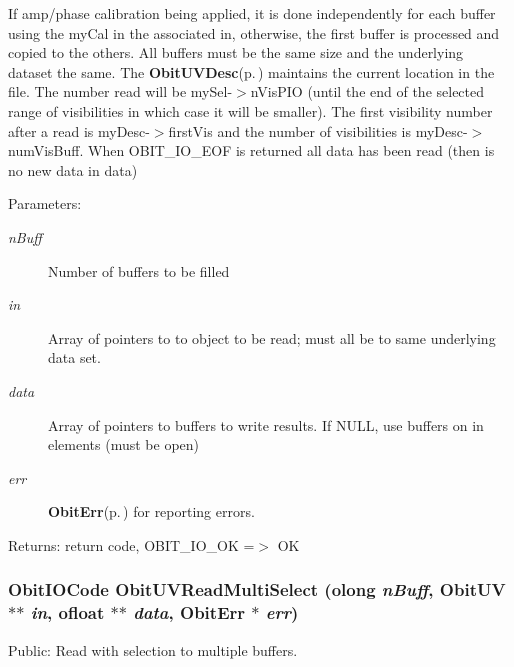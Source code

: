 If amp/phase calibration being applied, it is done independently for each buffer using the my\-Cal in the associated in, otherwise, the first buffer is processed and copied to the others. All buffers must be the same size and the underlying dataset the same. The {\bf Obit\-UVDesc}{\rm (p.\,\pageref{structObitUVDesc})} maintains the current location in the file. The number read will be my\-Sel-$>$n\-Vis\-PIO (until the end of the selected range of visibilities in which case it will be smaller). The first visibility number after a read is my\-Desc-$>$first\-Vis and the number of visibilities is my\-Desc-$>$num\-Vis\-Buff. When OBIT\_\-IO\_\-EOF is returned all data has been read (then is no new data in data) \begin{Desc}
\item[Parameters:]
\begin{description}
\item[{\em n\-Buff}]Number of buffers to be filled \item[{\em in}]Array of pointers to to object to be read; must all be to same underlying data set. \item[{\em data}]Array of pointers to buffers to write results. If NULL, use buffers on in elements (must be open) \item[{\em err}]{\bf Obit\-Err}{\rm (p.\,\pageref{structObitErr})} for reporting errors. \end{description}
\end{Desc}
\begin{Desc}
\item[Returns:]return code, OBIT\_\-IO\_\-OK =$>$ OK \end{Desc}
\subsubsection{\setlength{\rightskip}{0pt plus 5cm}Obit\-IOCode Obit\-UVRead\-Multi\-Select ({\bf olong} {\em n\-Buff}, {\bf Obit\-UV} $\ast$$\ast$ {\em in}, {\bf ofloat} $\ast$$\ast$ {\em data}, {\bf Obit\-Err} $\ast$ {\em err})}\label{ObitUV_8c_a26}


Public: Read with selection to multiple buffers. 

